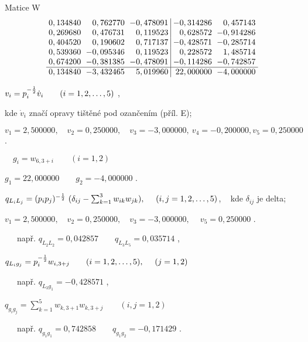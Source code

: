 \begin{Example}{Matice W}
\begin{align*}
\arraycolsep=3pt
\begin{array}{rrr|rr}
0,134840 &  0,762770 & -0,478091 & -0,314286 &  0,457143 \\
0,269680 &  0,476731 &  0,119523 &  0,628572 & -0,914286 \\
0,404520 &  0,190602 &  0,717137 & -0,428571 & -0,285714 \\
0,539360 & -0,095346 &  0,119523 &  0,228572 &  1,485714 \\
0,674200 & -0,381385 & -0,478091 & -0,114286 & -0,742857 \\
\hline
0,134840 & -3,432465 &  5,019960 & 22,000000 & -4,000000 \\
\end{array}
\end{align*}
\end{Example}

%
$v_i = p_i^{-{1\over2}}\dot v_i \qquad (i=1,2,\ldots,5)$ ,

\smallskip
\noindent
kde $\dot v_i$ značí opravy tištěné pod ozančením
 (příl. E);

$v_1 = 2,500000,\quad v_2=0,250000,\quad v_3=-3,000000,\
v_4=-0,200000, v_5=0,250000$ .

 $\quad g_i = w_{6,3+i} \qquad (i=1,2)$

\smallskip
$g_1 = 22,000000 \qquad g_2=-4,000000$ .


$q_{L_iL_j} = (p_i p_j)^{-{1\over2}}\
(\delta_{ij} - \sum_{k=1}^3 w_{ik}w_{jk}), \
\quad (i,j=1,2,\ldots,5)$,
~ kde $\delta_{ij}$ je  delta;

\smallskip
$v_1=2,500000,\quad v_2=0,250000,\quad v_3=-3,000000,\
\quad v_5=0,250000$ .

\smallskip
~~~např. $q_{L_2L_2} = 0,042857 \qquad q_{L_3L_5} = 0,035714$ ,

\smallskip
$q_{L_ig_j} = p_i^{-{1\over2}} w_{i,3+j} \qquad (i=1,2,\ldots,5),\
\quad(j=1,2)$

~~~např. $q_{L_3g_1} = -0,428571$ ,

$q_{g_ig_j} = \sum_{k=1}^5 w_{k,3+1} w_{k,3+j} \qquad (i,j=1,2)$

\smallskip
~~~např. $q_{g_1g_1} = 0,742858 \qquad q_{g_1g_2} = -0,171429$ .
